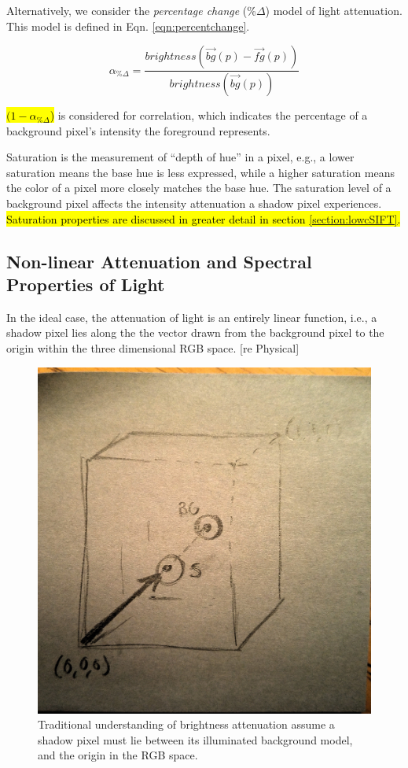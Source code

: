 Alternatively, we consider the \textit{percentage change} (\%$\Delta$) model of light attenuation. This model is defined in Eqn. \ref{eqn:percentchange}.

\begin{equation}
\alpha_{\%\Delta} = \dfrac{brightness(\vec{bg}(p) - \vec{fg}(p))}{brightness(\vec{bg}(p))}
\label{eqn:percentchange}
\end{equation}

\hl{$(1 - \alpha_{\%\Delta}$)} is considered for correlation, which indicates the percentage of a background pixel's intensity the foreground represents.

Saturation is the measurement of ``depth of hue'' in a pixel, e.g., a lower saturation means the base hue is less expressed, while a higher saturation means the color of a pixel more closely matches the base hue. The saturation level of a background pixel affects the intensity attenuation a shadow pixel experiences. \hl{Saturation properties are discussed in greater detail in section \ref{section:lowcSIFT}.}

\subsection{Non-linear Attenuation and Spectral Properties of Light} \label{section:nonlinearatten}

In the ideal case, the attenuation of light is an entirely linear function, i.e., a shadow pixel lies along the the vector drawn from the background pixel to the origin within the three dimensional RGB space. [re Physical]

\begin{figure}
  \centering
  \includegraphics[width=.5\linewidth]{figures/mockup_rgbcube.jpg}
  \caption{Traditional understanding of brightness attenuation assume a shadow pixel must lie between its illuminated background model, and the origin in the RGB space.}
  \label{fig:rgbcube}
\end{figure}

